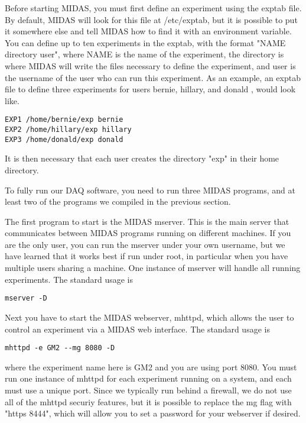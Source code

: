 Before starting MIDAS, you must first define an experiment using the exptab file. By default, MIDAS will look for this file at /etc/exptab, but it is possible to put it somewhere else and tell MIDAS how to find it with an environment variable. You can define up to ten experiments in the exptab, with the format "NAME directory user", where NAME is the name of the experiment, the directory is where MIDAS will write the files necessary to define the experiment, and user is the username of the user who can run this experiment. As an example, an exptab file to define three experiments for users bernie, hillary, and donald , would look like.

\begin{verbatim}
EXP1 /home/bernie/exp bernie
EXP2 /home/hillary/exp hillary
EXP3 /home/donald/exp donald
\end{verbatim}

It is then necessary that each user creates the directory "exp" in their home directory.

To fully run our DAQ software, you need to run three MIDAS programs, and at least two of the programs we compiled in the previous section.

The first program to start is the MIDAS mserver. This is the main server that communicates between MIDAS programs running on different machines. If you are the only user, you can run the mserver under your own username, but we have learned that it works best if run under root, in particular when you have multiple users sharing a machine. One instance of mserver will handle all running experiments. The standard usage is

\begin{verbatim}
mserver -D
\end{verbatim}

Next you have to start the MIDAS webserver, mhttpd, which allows the user to control an experiment via a MIDAS web interface. The standard usage is

\begin{verbatim}
mhttpd -e GM2 --mg 8080 -D
\end{verbatim}

where the experiment name here is GM2 and you are using port 8080. You must run one instance of mhttpd for each experiment running on a system, and each must use a unique port. Since we typically run behind a firewall, we do not use all of the mhttpd securiy features, but it is possible to replace the mg flag with "\-\-https 8444", which will allow you to set a password for your webserver if desired.

